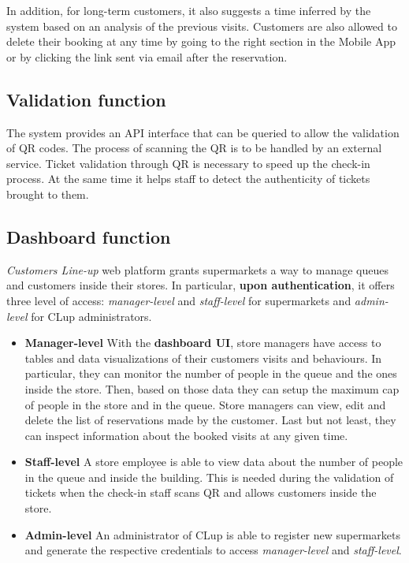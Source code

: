 In addition, for long-term customers, it also suggests a time inferred by the system based on an analysis of the previous visits.
Customers are also allowed to delete their booking at any time by going to the right section in the Mobile App or by clicking the link sent via email after the reservation.

\subsection{Validation function}
The system provides an API interface that can be queried to allow the validation of QR codes. The process of scanning the QR is to be handled by an external service.\newline
Ticket validation through QR is necessary to speed up the check-in process. At the same time it helps staff to detect the authenticity of tickets brought to them.

\subsection{Dashboard function}
\textit{Customers Line-up} web platform grants supermarkets a way to manage queues and customers inside their stores. In particular, \textbf{upon authentication}, it offers three level of access: \textit{manager-level} and \textit{staff-level} for supermarkets and \textit{admin-level} for CLup administrators.

\begin{itemize}
	\item \textbf{Manager-level}\newline
	With the \textbf{dashboard UI}, store managers have access to tables and data visualizations of their customers visits and behaviours. In particular, they can monitor the number of people in the queue and the ones inside the store. Then, based on those data they can setup the maximum cap of people in the store and in the queue.\newline
	Store managers can view, edit and delete the list of reservations made by the customer.\newline
	Last but not least, they can inspect information about the booked visits at any given time.

	\item \textbf{Staff-level}\newline
	A store employee is able to view data about the number of people in the queue and inside the building. This is needed during the validation of tickets when the check-in staff scans QR and allows customers inside the store.

    \item \textbf{Admin-level}\newline
    An administrator of CLup is able to register new supermarkets and generate the respective credentials to access \textit{manager-level} and \textit{staff-level}.
\end{itemize}

